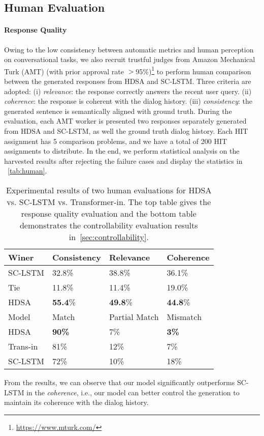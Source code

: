 \documentclass[11pt,a4paper]{article}
\begin{document}
\subsection{Human Evaluation}
\paragraph{Response Quality} Owing to the low consistency between automatic metrics and human perception on conversational tasks, we also recruit trustful judges from Amazon Mechanical Turk (AMT) (with prior approval rate $>$95\%)\footnote{\url{https://www.mturk.com/}} to perform human comparison between the generated responses from HDSA and SC-LSTM. Three criteria are adopted: (i) \emph{relevance}: the response correctly answers the recent user query. (ii) \emph{coherence}: the response is coherent with the dialog history. (iii) \emph{consistency}: the generated sentence is semantically aligned with ground truth. During the evaluation, each AMT worker is presented two responses separately generated from HDSA and SC-LSTM, as well the ground truth dialog history. Each HIT assignment has 5 comparison problems, and we have a total of 200 HIT assignments to distribute. In the end, we perform statistical analysis on the harvested results after rejecting the failure cases and display the statistics in ~\autoref{tab:human}. 
\begin{table}
\small
\centering
\begin{tabular}{llll} 
\toprule
Winer       & Consistency & Relevance & Coherence  \\ 
\midrule
SC-LSTM  & 32.8\%    & 38.8\%    &36.1\%    \\
Tie         & 11.8\%    & 11.4\%    & 19.0\%     \\
HDSA     & \textbf{55.4}\%    & \textbf{49.8}\%    & \textbf{44.8}\%     \\
\bottomrule
\toprule
Model            & Match & Partial Match & Mismatch  \\ 
\midrule
HDSA &    \textbf{90\%}   &     7\%    &   \textbf{3\%}  \\
Trans-in          &  81\%    &    12\%    &   7\%  \\
SC-LSTM          &  72\%    &    10\%    &   18\%  \\
\bottomrule
\end{tabular}
\caption{Experimental results of two human evaluations for HDSA vs. SC-LSTM vs. Transformer-in. The top table gives the response quality evaluation and the bottom table demonstrates the controllability evaluation results in~\autoref{sec:controllability}.}
\label{tab:human}
\vspace{-4ex}
\end{table}
From the results, we can observe that our model significantly outperforms SC-LSTM in the \emph{coherence}, i.e., our model can better control the generation to maintain its coherence with the dialog history.
\end{document}
